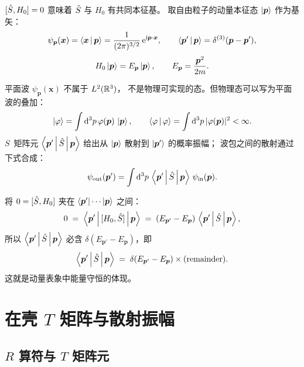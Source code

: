$[\hat{S},H_0]=0$ 意味着 $\hat{S}$ 与 $H_0$ 有共同本征基。
取自由粒子的动量本征态 $\ket{\bm{p}}$ 作为基矢：
\begin{equation}
\psi_{\bm{p}}(\bm{x}) = \left\langle \bm{x} \,\middle|\, \bm{p} \right\rangle = \frac{1}{(2\pi)^{3/2}}\,\mathrm{e}^{\mathrm{i}\bm{p}\cdot\bm{x}},
\qquad \left\langle \bm{p}' \,\middle|\, \bm{p} \right\rangle = \delta^{(3)}(\bm{p}-\bm{p}'),
\end{equation}
\begin{equation}
H_0 \ket{\bm{p}} = E_{\bm{p}}\ket{\bm{p}}, \qquad E_{\bm{p}} = \frac{\bm{p}^2}{2m}.
\label{eq:Ep}
\end{equation}

\begin{remark}
平面波 $\psi_{\bm{p}}(\bm{x})$ 不属于 $L^2(\mathbb{R}^3)$，
不是物理可实现的态。但物理态可以写为平面波的叠加：
\begin{equation}
\ket{\varphi} = \int \mathrm{d}^3 p\,\varphi(\bm{p})\,\ket{\bm{p}},
\qquad \left\langle \varphi \,\middle|\, \varphi \right\rangle = \int \mathrm{d}^3 p\,|\varphi(\bm{p})|^2 < \infty.
\end{equation}
$S$~矩阵元 $\left\langle \bm{p}' \,\middle|\, \hat{S} \,\middle|\, \bm{p} \right\rangle$ 给出从 $\ket{\bm{p}}$ 散射到 $\ket{\bm{p}'}$ 的概率振幅；
波包之间的散射通过下式合成：
\begin{equation}
\psi_{\text{out}}(\bm{p}') = \int \mathrm{d}^3 p\,\left\langle \bm{p}' \,\middle|\, \hat{S} \,\middle|\, \bm{p} \right\rangle\,\psi_{\text{in}}(\bm{p}).
\label{eq:psiout-Sphi}
\end{equation}
\end{remark}

将 $0 = [\hat{S}, H_0]$ 夹在 $\bra{\bm{p}'}\cdots\ket{\bm{p}}$ 之间：
\begin{equation}
0 \;=\; \left\langle \bm{p}' \,\middle|\, [H_0,\hat{S}] \,\middle|\, \bm{p} \right\rangle \;=\; (E_{\bm{p}'} - E_{\bm{p}})\,\left\langle \bm{p}' \,\middle|\, \hat{S} \,\middle|\, \bm{p} \right\rangle,
\end{equation}
所以 $\left\langle \bm{p}' \,\middle|\, \hat{S} \,\middle|\, \bm{p} \right\rangle$ 必含 $\delta(E_{\bm{p}'}-E_{\bm{p}})$，即
\begin{equation}
\left\langle \bm{p}' \,\middle|\, \hat{S} \,\middle|\, \bm{p} \right\rangle \;=\; \delta(E_{\bm{p}'}-E_{\bm{p}})\times(\text{remainder}).
\label{eq:S-energy-delta}
\end{equation}
这就是动量表象中能量守恒的体现。

\section{在壳 $T$ 矩阵与散射振幅}

\subsection{$R$ 算符与 $T$ 矩阵元}


